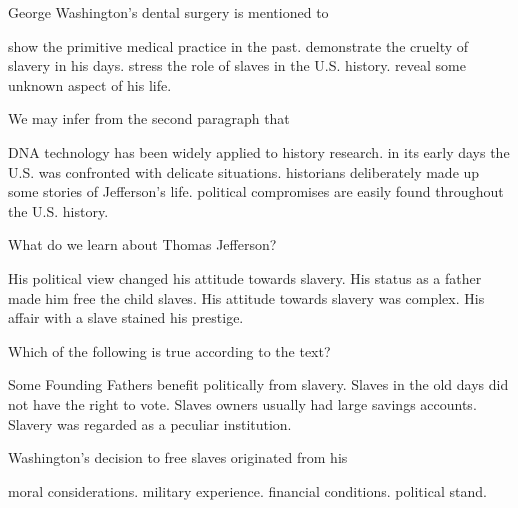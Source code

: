 \item George Washington's dental surgery is mentioned to
\begin{tasks}
	\task show the primitive medical practice in the past.
	\task demonstrate the cruelty of slavery in his days.
	\task stress the role of slaves in the U.S. history.
	\task reveal some unknown aspect of his life.
\end{tasks}
\item We may infer from the second paragraph that
\begin{tasks}
	\task DNA technology has been widely applied to history research.
	\task in its early days the U.S. was confronted with delicate situations.
	\task historians deliberately made up some stories of Jefferson's life.
	\task political compromises are easily found throughout the U.S. history.
\end{tasks}
\item What do we learn about Thomas Jefferson?
\begin{tasks}
	\task His political view changed his attitude towards slavery.
	\task His status as a father made him free the child slaves.
	\task His attitude towards slavery was complex.
	\task His affair with a slave stained his prestige.
\end{tasks}
\item Which of the following is true according to the text?
\begin{tasks}
	\task Some Founding Fathers benefit politically from slavery.
	\task Slaves in the old days did not have the right to vote.
	\task Slaves owners usually had large savings accounts.
	\task Slavery was regarded as a peculiar institution.
\end{tasks}
\item Washington's decision to free slaves originated from his
\begin{tasks}
	\task moral considerations.
	\task military experience.
	\task financial conditions.
	\task political stand.
\end{tasks}